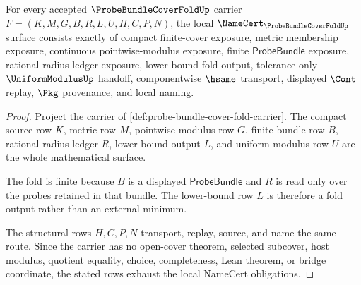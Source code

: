 \begin{theorem}
\label{thm:probe-bundle-cover-fold-obligations}
For every accepted $\ProbeBundleCoverFoldUp$ carrier $F=(K,M,G,B,R,L,U,H,C,P,N)$, the local $\NameCert_{\ProbeBundleCoverFoldUp}$ surface consists exactly of compact finite-cover exposure, metric membership exposure, continuous pointwise-modulus exposure, finite $\mathsf{ProbeBundle}$ exposure, rational radius-ledger exposure, lower-bound fold output, tolerance-only $\UniformModulusUp$ handoff, componentwise $\hsame$ transport, displayed $\Cont$ replay, $\Pkg$ provenance, and local naming.
\end{theorem}
\begin{proof}
Project the carrier of \autoref{def:probe-bundle-cover-fold-carrier}. The compact source row $K$, metric row $M$, pointwise-modulus row $G$, finite bundle row $B$, rational radius ledger $R$, lower-bound output $L$, and uniform-modulus row $U$ are the whole mathematical surface.

The fold is finite because $B$ is a displayed $\mathsf{ProbeBundle}$ and $R$ is read only over the probes retained in that bundle. The lower-bound row $L$ is therefore a fold output rather than an external minimum.

The structural rows $H,C,P,N$ transport, replay, source, and name the same route. Since the carrier has no open-cover theorem, selected subcover, host modulus, quotient equality, choice, completeness, Lean theorem, or bridge coordinate, the stated rows exhaust the local NameCert obligations.
\end{proof}

